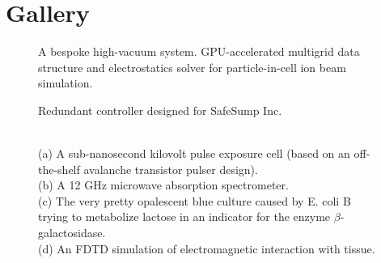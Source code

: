 \documentclass[fleqn,11pt]{article}
\begin{document}
\clearpage

\section{Gallery}
\begin{figure}[H]
	\centering
	\caption*{A bespoke high-vacuum system. GPU-accelerated multigrid data structure and electrostatics solver for particle-in-cell ion beam simulation.}
	\hfill
	
\end{figure}



\begin{figure}[H]
	\centering
	\caption*{Redundant controller designed for SafeSump Inc.}
	\hfill
	
\end{figure}



\begin{figure}[H]
	\centering
	
	
	\hfill
	
	\caption*{\\ (a) A sub-nanosecond kilovolt pulse exposure cell (based on an off-the-shelf avalanche transistor pulser design). \\ (b) A 12 GHz microwave absorption spectrometer. \\(c) The very pretty opalescent blue culture caused by E. coli B trying to metabolize lactose in an indicator for the enzyme $\beta$-galactosidase.\\ (d) An FDTD simulation of electromagnetic interaction with tissue. }
\end{figure}
\end{document}
